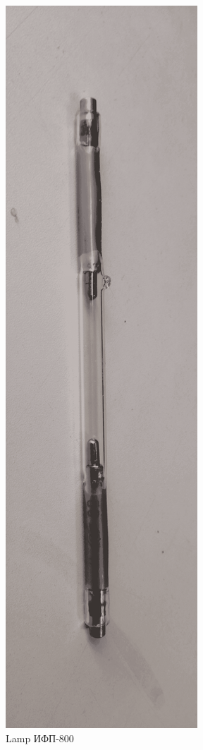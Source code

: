 \documentclass{beamer}
\begin{document}
\begin{frame}
\begin{columns}
\begin{figure}
				\includegraphics[width=\linewidth]{res/lamp_tube_xe.png}
				\caption*{Lamp ИФП-800}
			\end{figure}
		\end{columns}
	\end{frame}	
	
\end{document}
